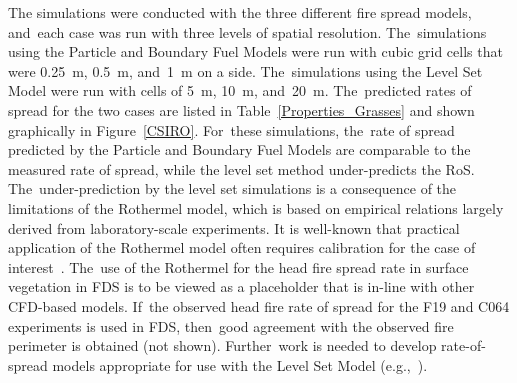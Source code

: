 \documentclass[atmosphere,article,accept,moreauthors,pdftex]{Definitions/mdpi}
\begin{document}
\begin{paracol}{2}
\switchcolumn







The simulations were conducted with the three different fire spread models, and~each case was run with three levels of spatial resolution. The~simulations using the Particle and Boundary Fuel Models were run with cubic grid cells that were 0.25~m, 0.5~m, and~1~m on a side. The~simulations using the Level Set Model were run with cells of 5~m, 10~m, and~20~m. The~predicted rates of spread for the two cases are listed in \mbox{Table~\ref{Properties_Grasses}} and shown graphically in Figure~\ref{CSIRO}. For~these simulations, the~rate of spread predicted by the Particle and Boundary Fuel Models are comparable to the measured rate of spread, while the level set method under-predicts the RoS. The~under-prediction by the level set simulations is a consequence of the limitations of the Rothermel model, which is based on empirical relations largely derived from laboratory-scale experiments. It is well-known that practical application of the Rothermel model often requires calibration for the case of interest~\cite{Arca_2007}. The~use of the Rothermel for the head fire spread rate in surface vegetation in FDS is to be viewed as a placeholder that is in-line with other CFD-based models. If~the observed head fire rate of spread for the F19 and C064 experiments is used in FDS, \mbox{then good} agreement with the observed fire perimeter is obtained (not shown). \mbox{Further work} is needed to develop rate-of-spread models appropriate for use with the Level Set Model (e.g.,~\cite{Mell:FBFC2019}).



\end{paracol}
\end{document}
